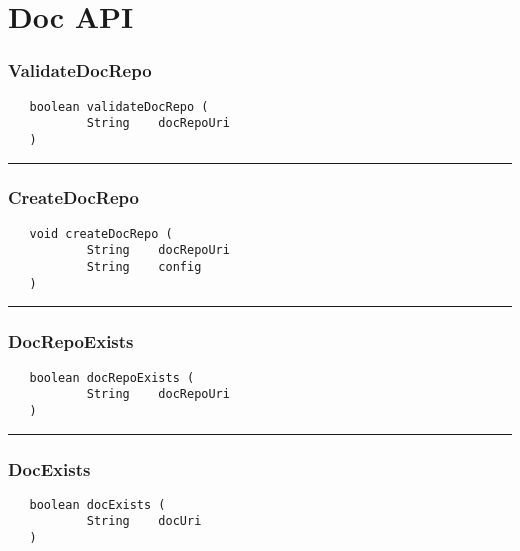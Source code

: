 \chapter{Doc API}

\subsection{ValidateDocRepo}
\label{Api:ValidateDocRepo}
\begin{verbatim}
   boolean validateDocRepo (
           String    docRepoUri
   )
\end{verbatim}



\rule{15cm}{2pt}
\subsection{CreateDocRepo}
\label{Api:CreateDocRepo}
\begin{verbatim}
   void createDocRepo (
           String    docRepoUri
           String    config
   )
\end{verbatim}



\rule{15cm}{2pt}
\subsection{DocRepoExists}
\label{Api:DocRepoExists}
\begin{verbatim}
   boolean docRepoExists (
           String    docRepoUri
   )
\end{verbatim}



\rule{15cm}{2pt}
\subsection{DocExists}
\label{Api:DocExists}
\begin{verbatim}
   boolean docExists (
           String    docUri
   )
\end{verbatim}



